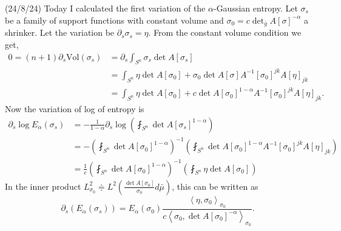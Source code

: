 \documentclass[12pt,a4paper]{article}
\begin{document}
(24/8/24) Today I calculated the first variation of the $ \alpha $-Gaussian entropy. Let $ \sigma_{s} $ be a family of support functions with constant volume and $ \sigma_{0} = c\det_{\overline{g}}A[\sigma]^{-\alpha} $ a shrinker. Let the variation be $ \partial_{s}\sigma_{s} = \eta $. From the constant volume condition we get, \begin{align*}
0 = (n+1)\partial_{s}\text{Vol}(\sigma_{s}) & = \partial_{s} 
\int_{S^{n}} \sigma_{s}\det A[\sigma_{s}] \\
& = \int_{S^{n}} \eta \det A[\sigma_{0}] + \sigma_{0}\det A[\sigma]A^{-1}[\sigma_{0}]^{jk}A[\eta]_{jk} \\
& = \int_{S^{n}} \eta \det A[\sigma_{0}] + c\det A[\sigma_{0}]^{1-\alpha}A^{-1}[\sigma_{0}]^{jk}A[\eta]_{jk}.
\end{align*}
Now the variation of log of entropy is 
\begin{align*}
   \partial_{s}\log E_{\alpha}(\sigma_{s}) & = - \frac{1}{1-\alpha}\partial_{s}\log \left( \fint_{S^{n}} \det A[\sigma_{s}]^{1-\alpha} \right) \\
   & = - \left( \fint_{S^{n}} \det A[\sigma_{0}]^{1-\alpha} \right)^{-1} \left( \fint_{S^{n}} \det A[\sigma_{0}]^{1-\alpha} A^{-1}[\sigma_{0}]^{jk}A[\eta]_{jk}  \right) \\
   & = \frac{1}{c} \left( \fint_{S^{n}} \det A[\sigma_{0}]^{1-\alpha} \right)^{-1} \left(\fint_{S^{n}} \eta \det A[\sigma_{0}] \right)
\end{align*}
In the inner product $ L^{2}_{\sigma_{0}} \doteqdot L^{2}\left( \frac{\det A[\sigma_{0}]}{\sigma_{0}}d \bar{\mu}\right) $, this can be written as 
\[ \partial_{s}(E_{\alpha}(\sigma_{s})) = E_{\alpha}(\sigma_{0}) \frac{ \left< \eta, \sigma_{0} \right>_{\sigma_{0}}}{c \left< \sigma_{0}, \det A[\sigma_{0}]^{-\alpha} \right>_{\sigma_{0}}}. \]
\end{document}
